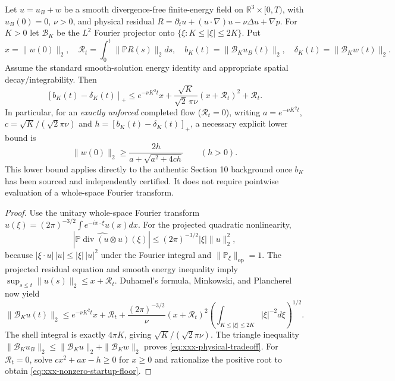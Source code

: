 \begin{theorem}
\label{thm:xxx-whole-space}
Let $u=u_B+w$ be a smooth divergence-free finite-energy field on
$\mathbb R^3\times[0,T)$, with $u_B(0)=0$, $\nu>0$, and physical
residual
$R=\partial_tu+(u\cdot\nabla)u-\nu\Delta u+\nabla p$.
For $K>0$ let $\mathcal B_K$ be the $L^2$ Fourier projector onto
$\{\xi:K\le|\xi|\le2K\}$. Put
\[
x=\|w(0)\|_2,\quad \mathcal R_t=\int_0^t\|\mathbb P R(s)\|_2ds,
\quad b_K(t)=\|\mathcal B_Ku_B(t)\|_2,
\quad\delta_K(t)=\|\mathcal B_Kw(t)\|_2.
\]
Assume the standard smooth-solution energy identity and appropriate
spatial decay/integrability. Then
\begin{equation}\label{eq:xxx-physical-tradeoff}
\boxed{\quad
[b_K(t)-\delta_K(t)]_+\le
 e^{-\nu K^2t}x+
 \frac{\sqrt K}{\sqrt2\,\pi\nu}(x+\mathcal R_t)^2+
 \mathcal R_t.\quad}
\end{equation}
In particular, for an \emph{exactly unforced} completed flow
($\mathcal R_t=0$), writing
$a=e^{-\nu K^2t}$, $c=\sqrt K/(\sqrt2\pi\nu)$ and
$h=[b_K(t)-\delta_K(t)]_+$, a necessary explicit lower bound is
\begin{equation}\label{eq:xxx-nonzero-startup-floor}
\boxed{\quad
\|w(0)\|_2\ge
\frac{2h}{a+\sqrt{a^2+4ch}}\qquad(h>0).\quad}
\end{equation}
This lower bound applies directly to the authentic Section 10
background once $b_K$ has been sourced and independently certified.
It does not require pointwise evaluation of a whole-space Fourier
transform.
\end{theorem}
\begin{proof}
Use the unitary whole-space Fourier transform
$\widehat u(\xi)=(2\pi)^{-3/2}\int e^{-ix\cdot\xi}u(x)dx$.
For the projected quadratic nonlinearity,
\[
\left|\widehat{\mathbb P\operatorname{div}(u\otimes u)}(\xi)\right|
\le(2\pi)^{-3/2}|\xi|\|u\|_2^2,
\]
because $|\xi\cdot u|\,|u|\le|\xi|\,|u|^2$ under the
Fourier integral and $\|\mathbb P_\xi\|_{\mathrm{op}}=1$.
The projected residual equation and smooth energy inequality imply
$\sup_{s\le t}\|u(s)\|_2\le x+\mathcal R_t$.
Duhamel's formula, Minkowski, and Plancherel now yield
\[
\|\mathcal B_Ku(t)\|_2\le
 e^{-\nu K^2t}x+\mathcal R_t+
 \frac{(2\pi)^{-3/2}}\nu(x+\mathcal R_t)^2
 \left(\int_{K\le|\xi|\le2K}|\xi|^{-2}d\xi\right)^{1/2}.
\]
The shell integral is exactly $4\pi K$, giving
$\sqrt K/(\sqrt2\pi\nu)$. The triangle inequality
$\|\mathcal B_Ku_B\|_2\le\|\mathcal B_Ku\|_2+
\|\mathcal B_Kw\|_2$ proves
\eqref{eq:xxx-physical-tradeoff}. For $\mathcal R_t=0$,
solve $cx^2+ax-h\ge0$ for $x\ge0$ and rationalize the
positive root to obtain \eqref{eq:xxx-nonzero-startup-floor}.
\end{proof}

